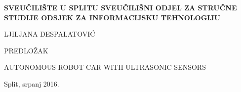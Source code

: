 %
%
\begin{titlepage}
\bfseries
\headerdata
{SVEUČILIŠTE U SPLITU}
{SVEUČILIŠNI ODJEL ZA STRUČNE STUDIJE}
{ODSJEK ZA INFORMACIJSKU TEHNOLOGIJU}

\vspace*{6cm}
\begin{center}
{\Large LJILJANA DESPALATOVIĆ}

\vspace*{3cm}

{\large {PREDLOŽAK}}

\vspace*{0.5cm}
\Huge AUTONOMOUS ROBOT CAR WITH ULTRASONIC SENSORS\\[1cm]

\end{center}
\begin{center}
\vfill
{\large Split, srpanj 2016.}
\end{center}
\end{titlepage}
%
%
